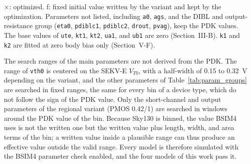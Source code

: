 \documentclass[a4paper,10pt,twoside,twocolumn,final]{JICS_LaTexGuidelines} %
\begin{document}
\begin{table}[htbp]\tiny
	\centering
	\caption{Parameters whose final value differs from the PDK bin}
	\label{tab:param_groups}
	\renewcommand{\arraystretch}{1.2}

	\vspace{1mm}
	\parbox{\columnwidth}{\tiny $\times$: optimized. f: fixed initial value written by the variant and kept by the optimization. Parameters not listed, including \texttt{a0}, \texttt{ags}, and the DIBL and output-resistance group (\texttt{eta0}, \texttt{pdiblc1}, \texttt{pdiblc2}, \texttt{drout}, \texttt{pvag}), keep the PDK values. The base values of \texttt{ute}, \texttt{kt1}, \texttt{kt2}, \texttt{ua1}, and \texttt{ub1} are zero (Section~III-B). \texttt{k1} and \texttt{k2} are fitted at zero body bias only (Section~V-F).}
\end{table}

The search ranges of the main parameters are not derived from the PDK. The range of \texttt{vth0} is centered on the SEKV-E $V_{T0}$, with a half-width of 0.15 to 0.32~V depending on the variant, and the other parameters of Table~\ref{tab:param_groups} are searched in fixed ranges, the same for every bin of a device type, which do not follow the sign of the PDK value. Only the short-channel and output parameters of the regional variant (PMOS 0.42/1) are searched in windows around the PDK value of the bin. Because Sky130 is binned, the value BSIM4 uses is not the written one but the written value plus length, width, and area terms of the bin; a written value inside a plausible range can thus produce an effective value outside the valid range. Every model is therefore simulated with the BSIM4 parameter check enabled, and the four models of this work pass it.
\end{document}
